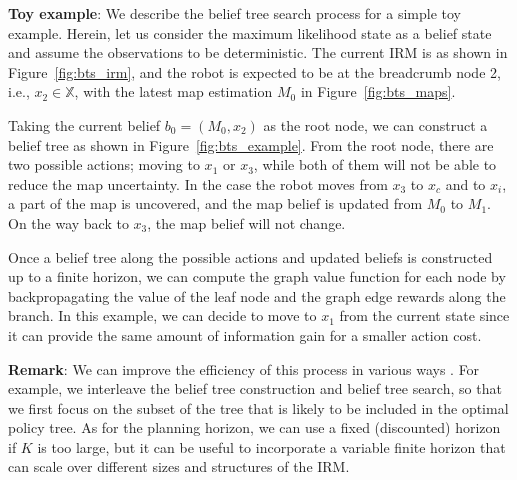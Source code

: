 \documentclass{article}
\newcommand{\ph}[1]{{\textbf{#1}:}} %
\begin{document}
\ph{Toy example}
We describe the belief tree search process for a simple toy example.
Herein, let us consider the maximum likelihood state as a belief state and assume the observations to be deterministic.
The current IRM is as shown in Figure~\ref{fig:bts_irm}, and the robot is expected to be at the breadcrumb node 2, i.e., $x_2 \in \mathbb{X}$, with the latest map estimation $M_0$ in Figure~\ref{fig:bts_maps}.

Taking the current belief $b_0 = (M_0, x_2)$ as the root node, we can construct a belief tree as shown in Figure~\ref{fig:bts_example}.
From the root node, there are two possible actions; moving to $x_1$ or $x_3$, while both of them will not be able to reduce the map uncertainty.
In the case the robot moves from $x_3$ to $x_c$ and to $x_i$, a part of the map is uncovered, and the map belief is updated from $M_0$ to $M_{1}$.
On the way back to $x_3$, the map belief will not change.

Once a belief tree along the possible actions and updated beliefs is constructed up to a finite horizon, we can compute the graph value function for each node by backpropagating the value of the leaf node and the graph edge rewards along the branch.
In this example, we can decide to move to $x_1$ from the current state since it can provide the same amount of information gain for a smaller action cost.


\ph{Remark} We can improve the efficiency of this process in various ways \cite{silver2010monte,somani2013despot,bonet1998learning,kim2019pomhdp}.
For example, we interleave the belief tree construction and belief tree search, so that we first focus on the subset of the tree that is likely to be included in the optimal policy tree. As for the planning horizon, we can use a fixed (discounted) horizon if $K$ is too large, but it can be useful to incorporate a variable finite horizon that can scale over different sizes and structures of the IRM.


\end{document}
